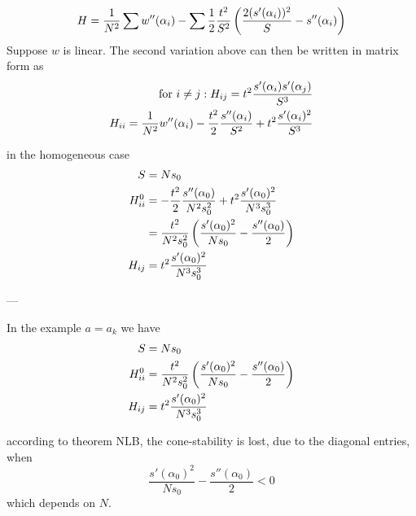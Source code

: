 \documentclass[]{article}
\begin{document}
\begin{equation}
    \label{eqn:}
H=\frac{1}{N^2}\sum w''(\alpha_i)  -
\sum\frac12 \frac{\load^2}{S^2}
\left( \frac{2(s'(\alpha_i))^2}{S} - s''(\alpha_i) \right)   
%
\end{equation}
Suppose $w$ is linear.
The second variation above can then be written in matrix form as 
\begin{subequations}
    \begin{align}
    \label{eq:second_varia_discrete}
    \text{ for } i \neq j: H_{ij} = t^2 \frac{s'(\alpha_i) s'(\alpha_j)}{S^3} \\
    H_{ii} = \frac{1}{N^2} w''(\alpha_i) - \frac{t^2}{2}  \frac{s''(\alpha_i)}{S^2}  + t^2 \frac{s'(\alpha_i)^2}{S^3} 
    \end{align} 
    \end{subequations}

    in the homogeneous case
    \begin{align}
        \label{eqn:}
        S&=Ns_0 \\
        H_{ii}^0 &= - \frac{t^2}{2}  \frac{s''(\alpha_0)}{N^2s_0^2}  + t^2 \frac{s'(\alpha_0)^2}{N^3s_0^3}\\
         &= 
         \frac{t^2}{ N^2s_0^2} \left(\frac{s'(\alpha_0)^2}{Ns_0} - \frac{s''(\alpha_0)}{2} \right) \\
         H_{ij} &= t^2 \frac{s'(\alpha_0)^2}{N^3s_0^3}
    \end{align}

--- 

In the example $a=a_k$
we have
\begin{align}
    \label{eqn:}
    S&=Ns_0 \\
    H_{ii}^0 &= \frac{t^2}{ N^2s_0^2} \left(\frac{s'(\alpha_0)^2}{Ns_0} - \frac{s''(\alpha_0)}{2} \right) \\
    H_{ij} &= t^2 \frac{s'(\alpha_0)^2}{N^3s_0^3}
\end{align}

according to theorem NLB, the cone-stability is lost, due to the diagonal entries, 
when
\begin{equation}
    \label{eqn:}
    \frac{s'(\alpha_0)^2}{Ns_0} - \frac{s''(\alpha_0)}{2}<0
\end{equation}
which depends on $N$.
\end{document}
